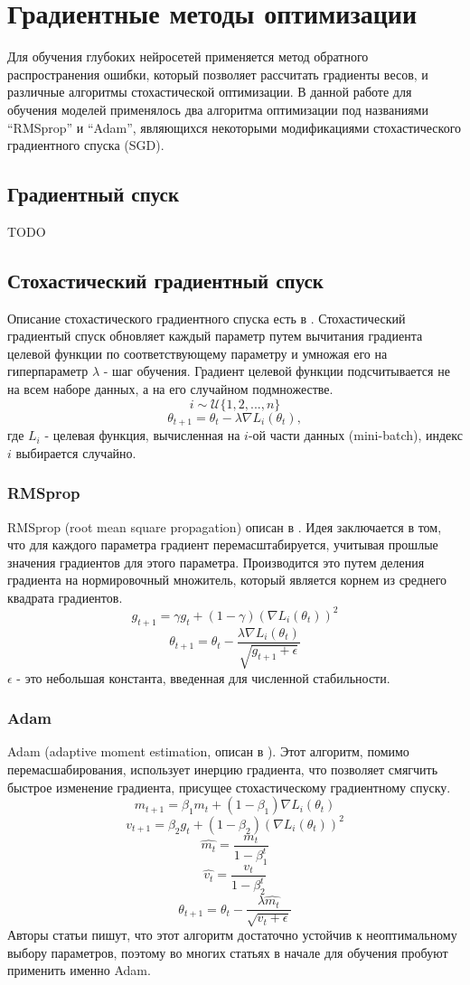\clearpage
\section{Градиентные методы оптимизации}
	Для обучения глубоких нейросетей применяется метод обратного распространения ошибки, который позволяет рассчитать градиенты весов, и различные алгоритмы стохастической оптимизации. В данной работе для обучения моделей применялось два алгоритма оптимизации под названиями ``RMSprop'' и ``Adam'', являющихся некоторыми модификациями стохастического градиентного спуска (SGD).
	\subsection{Градиентный спуск}
		TODO
	\subsection{Стохастический градиентный спуск}
		Описание стохастического градиентного спуска есть в \cite{sgd}. Стохастический градиентый спуск обновляет каждый параметр путем вычитания градиента целевой функции по соответствующему параметру и умножая его на гиперпараметр $\lambda$ - шаг обучения. Градиент целевой функции подсчитывается не на всем наборе данных, а на его случайном подмножестве.
		$$ i \sim \mathcal{U}\{1, 2, ..., n\} $$
		$$ \theta_{t+1} = \theta_t - \lambda \nabla L_i(\theta_t), $$
		где $L_i$ - целевая функция, вычисленная на $i$-ой части данных (mini-batch), индекс $i$ выбирается случайно.
		\subsubsection{RMSprop}
			RMSprop (root mean square propagation) описан в \cite{rmsprop}. Идея заключается в том, что для каждого параметра градиент перемасштабируется, учитывая прошлые значения градиентов для этого параметра. Производится это путем деления градиента на нормировочный множитель, который является корнем из среднего квадрата градиентов.
			$$ g_{t+1} = \gamma g_t + (1 - \gamma) (\nabla L_i(\theta_t))^2$$
			$$ \theta_{t+1} = \theta_t - \frac{\lambda \nabla L_i(\theta_t)}{\sqrt{g_{t+1} + \epsilon}} $$
			$\epsilon$ - это небольшая константа, введенная для численной стабильности.
		\subsubsection{Adam}
			Adam (adaptive moment estimation, описан в \cite{adam}). Этот алгоритм, помимо перемасшабирования, использует инерцию градиента, что позволяет смягчить быстрое изменение градиента, присущее стохастическому градиентному спуску.
			$$ m_{t+1} = \beta_1 m_t + (1 - \beta_1) \nabla L_i(\theta_t) $$
			$$ v_{t+1} = \beta_2 g_t + (1 - \beta_2) (\nabla L_i(\theta_t))^2 $$
			$$ \hat{m_t} = \frac{m_t}{1 - \beta_1^t} $$
			$$ \hat{v_t} = \frac{v_t}{1 - \beta_2^t}$$
			$$ \theta_{t+1} = \theta_t - \frac{\lambda \hat{m_t}}{\sqrt{v_t + \epsilon}} $$
			Авторы статьи \cite{adam} пишут, что этот алгоритм достаточно устойчив к неоптимальному выбору параметров, поэтому во многих статьях в начале для обучения пробуют применить именно Adam.